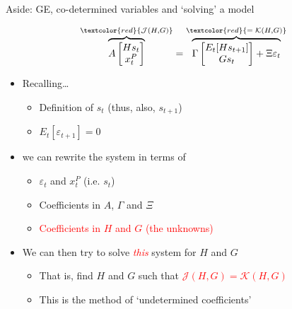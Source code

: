 \begin{frame}{Aside: GE, co-determined variables and `solving' a model}

\begin{gather*}
 \overbrace{A \begin{bmatrix} H s_{t} \\ x^{P}_{t} \end{bmatrix}}^{\textcolor{red}{\mathcal{J}(H,G)}}
 =
 \overbrace{\Gamma 
  \begin{bmatrix}
   E_{t}[ H s_{t+1} ] \\ G s_{t}
   \end{bmatrix}
 + 
 \Xi \varepsilon_{t}}^{\textcolor{red}{= \; \mathcal{K}(H,G)}}
\end{gather*}

\begin{itemize}
\item	Recalling\ldots
	\begin{itemize}
	\item	Definition of $s_{t}$ (thus, also, $s_{t+1}$)
	\item	$E_{t}[ \varepsilon_{t+1} ] = 0$
	\end{itemize}
\item[] we can rewrite the system in terms of
	\begin{itemize}
	\item	$\varepsilon_{t}$ and $x^{P}_{t}$ (i.e. $s_{t}$)
	\item	Coefficients in $A$, $\Gamma$ and $\Xi$
	\item	\textcolor{red}{Coefficients in $H$ and $G$ (the unknowns)}
	\end{itemize}
\vspace{2mm}
\item	We can then try to solve \textcolor{red}{\textit{this}} system for $H$ and $G$
	\begin{itemize}
	\item	That is, find $H$ and $G$ such that \textcolor{red}{$\mathcal{J}(H,G) = \mathcal{K}(H,G)$}
	\item	This is the method of `undetermined coefficients'
	\end{itemize}
\end{itemize}

\end{frame}